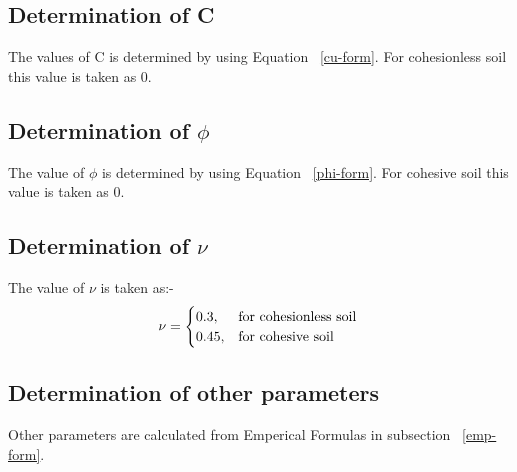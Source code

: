 \subsection{Determination of C}
The values of C is determined by using Equation ~\ref{cu-form}. For cohesionless soil this value is taken as 0.

\subsection{Determination of $\phi$}
The value of $\phi$ is determined by using Equation ~\ref{phi-form}. For cohesive soil this value is taken as 0.

\subsection{Determination of $\nu$}
The value of $\nu$ is taken as:-
\begin{equation}
\nu= \begin{cases}
    0.3, & \text{for cohesionless soil}\\
    0.45, & \text{for cohesive soil}
    \end{cases}\\
\end{equation}

\subsection{Determination of other parameters}
Other parameters are calculated from Emperical Formulas in subsection ~\ref{emp-form}.